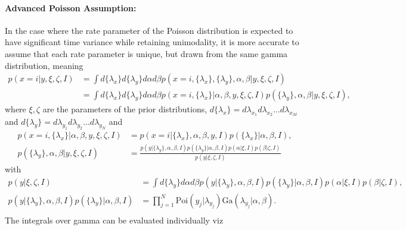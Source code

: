 \begin{example}
	\paragraph{Advanced Poisson Assumption:} In the case where the rate parameter of the Poisson distribution is expected to have significant time variance while retaining unimodality, it is more accurate to assume that each rate parameter is unique, but drawn from the same gamma distribution, meaning
	\begin{equation}
		\begin{split}
			p(x = i|y,\xi,\zeta,I) &= \int d\{\lambda_x\}d\{\lambda_y\} d\alpha d\beta p(x = i,\{\lambda_x\},\{\lambda_y\} ,\alpha, \beta|y,\xi,\zeta,I)\\
			&=\int d\{\lambda_x\}d\{\lambda_y\}d\alpha d\beta p(x=i,\{\lambda_x\}|\alpha, \beta,y,\xi,\zeta,I)p(\{\lambda_y\},\alpha,\beta|y,\xi,\zeta,I),
		\end{split}
		\label{r1}
	\end{equation}
	where $\xi,\zeta$ are the parameters of the prior distributions, $d\{\lambda_x\} = d\lambda_{x_1}d\lambda_{x_2}\dots d\lambda_{x_M}$ and $d\{\lambda_y\}=d\lambda_{y_1}d\lambda_{y_2}\dots d\lambda_{y_N}$ and
	\begin{equation}
		\begin{split}
			p(x=i,\{\lambda_x\}|\alpha, \beta,y,\xi,\zeta,I) &= p(x=i|\{\lambda_x\},\alpha, \beta,y,I)p(\{\lambda_x\}|\alpha, \beta,I),\\
			p(\{\lambda_y\},\alpha,\beta|y,\xi,\zeta,I) & = \frac{p(y|\{\lambda_y\},\alpha, \beta,I)p(\{\lambda_y\}|\alpha, \beta,I)p(\alpha|\xi,I)p(\beta|\zeta,I)}{p(y|\xi,\zeta,I)}
		\end{split}
	\end{equation}
	with
	\begin{equation}
		\begin{split}
			p(y|\xi,\zeta,I) & = \int d\{\lambda_y\} d\alpha d\beta p(y|\{\lambda_y\},\alpha, \beta,I)p(\{\lambda_y\}|\alpha, \beta,I)p(\alpha|\xi,I)p(\beta|\zeta,I),\\
			p(y|\{\lambda_y\},\alpha, \beta,I)p(\{\lambda_y\}|\alpha, \beta,I) &= \prod_{j=1}^N\text{Poi}(y_j|\lambda_{y_j})\text{Ga}(\lambda_{y_j}|\alpha,\beta).\\
		\end{split}
	\end{equation}
	The integrals over gamma can be evaluated individually viz
	\begin{equation}

\end{equation}
\end{example}

